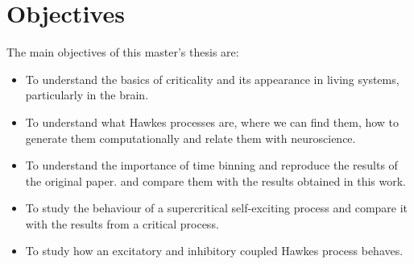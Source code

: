 \chapter{Objectives} \label{ch:objectives}

The main objectives of this master's thesis are:

\begin{itemize}
    \item To understand the basics of criticality and its appearance in living systems, particularly in the brain. 
    \item To understand what Hawkes processes are, where we can find them, how to generate them computationally and relate them with neuroscience.
    \item To understand the importance of time binning and reproduce the results of the original paper.
    \cite{notarmuzi2021percolation} and compare them with the results obtained in this work.
    \item To study the behaviour of a supercritical self-exciting process and compare it with the results from a critical process. 
    \item To study how an excitatory and inhibitory coupled Hawkes process behaves.
\end{itemize}